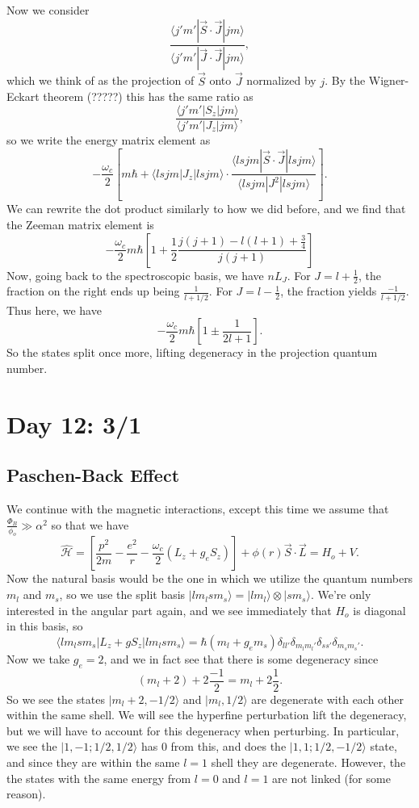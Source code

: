 \documentclass[fontsize=12pt]{scrartcl}
\newcommand{\la}{\langle}
\newcommand{\ra}{\rangle}
\newcommand{\Ham}{\hat{\mathcal{H}}}
\begin{document}
Now we consider $$\frac{\la j'm'|\vec{S}\cdot\vec{J}|jm\ra}{\la j'm'|\vec{J}\cdot\vec{J}|jm\ra},$$ which we think of as the projection of $\vec{S}$ onto $\vec{J}$ normalized by $j$. By the Wigner-Eckart theorem (?????) this has the same ratio as $$\frac{\la j'm'|S_z|jm\ra}{\la j'm'|J_z|jm\ra},$$ so we write the energy matrix element as $$-\frac{\omega_c}{2}\left[m\hbar + \la lsjm|J_z|lsjm\ra \cdot \frac{\la lsjm|\vec{S}\cdot\vec{J}|lsjm\ra}{\la lsjm|J^2|lsjm\ra}\right].$$ We can rewrite the dot product similarly to how we did before, and we find that the Zeeman matrix element is $$-\frac{\omega_c}{2}m\hbar\left[1+\frac{1}{2}\frac{j(j+1)-l(l+1)+\frac{3}{4}}{j(j+1)}\right]$$ Now, going back to the spectroscopic basis, we have $nL_J$. For $J=l+\frac{1}{2}$, the fraction on the right ends up being $\frac{1}{l+1/2}$. For $J=l-\frac{1}{2}$, the fraction yields $\frac{-1}{l+1/2}$. Thus here, we have $$-\frac{\omega_c}{2}m\hbar\left[1\pm \frac{1}{2l+1}\right].$$ So the states split once more, lifting degeneracy in the projection quantum number.


\section{Day 12: 3/1}

\subsection{Paschen-Back Effect}

We continue with the magnetic interactions, except this time we assume that $\frac{\Phi_B}{\phi_o}\gg \alpha^2$ so that we have $$\Ham = \left[\frac{p^2}{2m}-\frac{e^2}{r}-\frac{\omega_c}{2}(L_z+g_eS_z)\right]+\phi(r)\vec{S}\cdot\vec{L} = H_o+V.$$ Now the natural basis would be the one in which we utilize the quantum numbers $m_l$ and $m_s$, so we use the split basis $|lm_lsm_s\ra = |lm_l\ra\otimes |sm_s\ra$. We're only interested in the angular part again, and we see immediately that $H_o$ is diagonal in this basis, so $$\la lm_lsm_s|L_z+gS_z|lm_lsm_s\ra = \hbar(m_l+g_em_s)\delta_{ll'}\delta_{m_lm_l'}\delta_{ss'}\delta_{m_sm_s'}.$$ Now we take $g_e=2$, and we in fact see that there is some degeneracy since $$(m_l+2)+2\frac{-1}{2}= m_l+2\frac{1}{2}.$$ So we see the states $|m_l+2, -1/2\ra$ and $|m_l, 1/2\ra$ are degenerate with each other within the same shell. We will see the hyperfine perturbation lift the degeneracy, but we will have to account for this degeneracy when perturbing. In particular, we see the $|1,-1;1/2,1/2\ra$ has $0$ from this, and does the $|1,1;1/2,-1/2\ra$ state, and since they are within the same $l=1$ shell they are degenerate. However, the the states with the same energy from $l=0$ and $l=1$ are not linked (for some reason).
\end{document}
